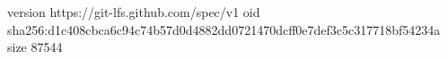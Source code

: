 version https://git-lfs.github.com/spec/v1
oid sha256:d1c408cbca6c94c74b57d0d4882dd0721470dcff0e7def3c5c317718bf54234a
size 87544
